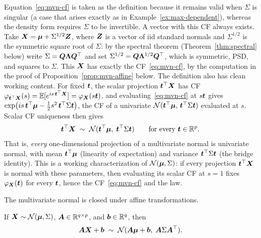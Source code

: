 Equation~\eqref{eq:mvn-cf} is taken as the definition because it remains valid when \(\Sigma\) is singular (a case that arises exactly as in Example~\ref{ex:max-dependent}), whereas the density form requires \(\Sigma\) to be invertible. A vector with this CF always exists. Take \(\bm{X} = \bm{\mu} + \Sigma^{1/2} \bm{Z}\), where \(\bm{Z}\) is a vector of iid standard normals and \(\Sigma^{1/2}\) is the symmetric square root of \(\Sigma\): by the spectral theorem (Theorem~\ref{thm:spectral} below) write \(\Sigma = \bm{Q} \bm{\Lambda} \bm{Q}^{\top}\) and set \(\Sigma^{1/2} = \bm{Q} \bm{\Lambda}^{1/2} \bm{Q}^{\top}\), which is symmetric, PSD, and squares to \(\Sigma\). This \(\bm{X}\) has exactly the CF~\eqref{eq:mvn-cf}, by the computation in the proof of Proposition~\ref{prop:mvn-affine} below. The definition also has clean working content. For fixed \(\bm{t}\), the scalar projection \(\bm{t}^{\top} \bm{X}\) has CF \(\varphi_{\bm{t}^{\top} \bm{X}}(s) = \mathbb{E}[e^{i s\, \bm{t}^{\top} \bm{X}}] = \varphi_{\bm{X}}(s \bm{t})\), and evaluating~\eqref{eq:mvn-cf} at \(s\bm{t}\) gives \(\exp\bigl(i s\, \bm{t}^{\top} \bm{\mu} - \tfrac{1}{2} s^2\, \bm{t}^{\top} \Sigma \bm{t}\bigr)\), the CF of a univariate \(\mathcal{N}(\bm{t}^{\top} \bm{\mu},\, \bm{t}^{\top} \Sigma \bm{t})\) evaluated at \(s\). Scalar CF uniqueness then gives
\begin{equation}
  \bm{t}^{\top} \bm{X} \;\sim\; \mathcal{N}(\bm{t}^{\top} \bm{\mu},\; \bm{t}^{\top} \Sigma \bm{t}) \qquad \text{for every } \bm{t} \in \mathbb{R}^p.
  \label{eq:mvn-projection}
\end{equation}
That is, \emph{every} one-dimensional projection of a multivariate normal is univariate normal, with mean \(\bm{t}^{\top}\bm{\mu}\) (linearity of expectation) and variance \(\bm{t}^{\top}\Sigma\bm{t}\) (the bridge identity). This is a working characterization of \(\mathcal{N}(\bm{\mu}, \Sigma)\): if every projection \(\bm{t}^{\top}\bm{X}\) is normal with these parameters, then evaluating its scalar CF at \(s=1\) fixes \(\varphi_{\bm{X}}(\bm{t})\) for every \(\bm{t}\), hence the CF~\eqref{eq:mvn-cf} and the law.

The multivariate normal is closed under affine transformations.

\begin{proposition}\label{prop:mvn-affine}
If \(\bm{X} \sim \mathcal{N}(\bm{\mu}, \Sigma)\), \(\bm{A} \in \mathbb{R}^{q \times p}\), and \(\bm{b} \in \mathbb{R}^q\), then
\[
  \bm{A} \bm{X} + \bm{b} \;\sim\; \mathcal{N}(\bm{A} \bm{\mu} + \bm{b},\; \bm{A} \Sigma \bm{A}^{\top}).
\]
\end{proposition}

